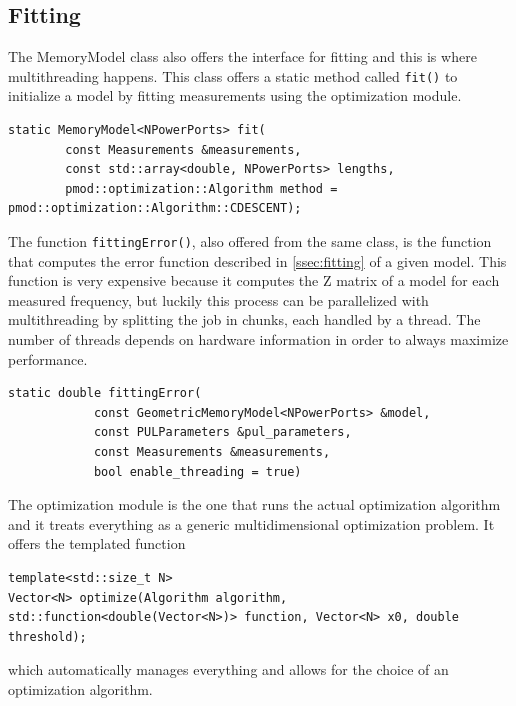 \subsection{Fitting}
The MemoryModel class also offers the interface for fitting and this is where multithreading happens. This class offers a static method called \texttt{fit()} to initialize a model by fitting measurements using the optimization module.
\begin{lstlisting}
static MemoryModel<NPowerPorts> fit(
        const Measurements &measurements,
        const std::array<double, NPowerPorts> lengths,
        pmod::optimization::Algorithm method = pmod::optimization::Algorithm::CDESCENT);
\end{lstlisting}
The function \texttt{fittingError()}, also offered from the same class, is the function that computes the error function described in \autoref{ssec:fitting} of a given model. This function is very expensive because it computes the Z matrix of a model for each measured frequency, but luckily this process can be parallelized with multithreading by splitting the job in chunks, each handled by a thread. The number of threads depends on hardware information in order to always maximize performance.
\begin{lstlisting}
static double fittingError(
            const GeometricMemoryModel<NPowerPorts> &model,
            const PULParameters &pul_parameters,
            const Measurements &measurements,
            bool enable_threading = true)
\end{lstlisting}

The optimization module is the one that runs the actual optimization algorithm and it treats everything as a generic multidimensional optimization problem. It offers the templated function
\begin{lstlisting}
template<std::size_t N>
Vector<N> optimize(Algorithm algorithm, std::function<double(Vector<N>)> function, Vector<N> x0, double threshold);
\end{lstlisting}
which automatically manages everything and allows for the choice of an optimization algorithm.

